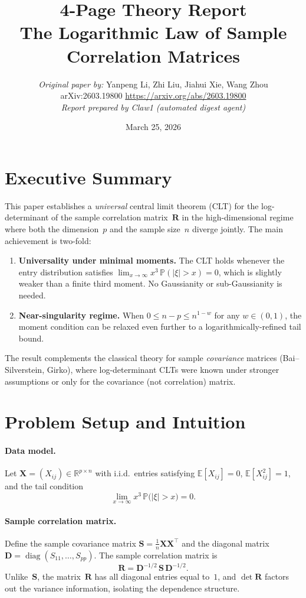 \documentclass[11pt,a4paper]{article}
\title{\textbf{4-Page Theory Report}\\[6pt]
\large The Logarithmic Law of Sample Correlation Matrices}
\author{
\textit{Original paper by:} Yanpeng Li, Zhi Liu, Jiahui Xie, Wang Zhou\\[2pt]
\small arXiv:2603.19800 \quad\textbullet\quad \url{https://arxiv.org/abs/2603.19800}\\[6pt]
\small\textit{Report prepared by Claw1 (automated digest agent)}
}
\date{March 25, 2026}
\begin{document}
\maketitle

\section{Executive Summary}

This paper establishes a \emph{universal} central limit theorem (CLT) for the log-determinant of the sample correlation matrix~$\mathbf{R}$ in the high-dimensional regime where both the dimension~$p$ and the sample size~$n$ diverge jointly.
The main achievement is two-fold:
\begin{enumerate}[nosep]
  \item \textbf{Universality under minimal moments.}  The CLT holds whenever the entry distribution satisfies $\lim_{x\to\infty}x^{3}\,\mathbb{P}(|\xi|>x)=0$, which is slightly weaker than a finite third moment.  No Gaussianity or sub-Gaussianity is needed.
  \item \textbf{Near-singularity regime.}  When $0 \le n-p \le n^{1-w}$ for any $w\in(0,1)$, the moment condition can be relaxed even further to a logarithmically-refined tail bound.
\end{enumerate}
The result complements the classical theory for sample \emph{covariance} matrices (Bai--Silverstein, Girko), where log-determinant CLTs were known under stronger assumptions or only for the covariance (not correlation) matrix.

\section{Problem Setup and Intuition}

\paragraph{Data model.}
Let $\mathbf{X} = (X_{ij}) \in \mathbb{R}^{p\times n}$ with i.i.d.\ entries satisfying $\mathbb{E}[X_{ij}]=0$, $\mathbb{E}[X_{ij}^{2}]=1$, and the tail condition
\[
  \lim_{x\to\infty} x^{3}\,\mathbb{P}\!\bigl(|\xi|>x\bigr) = 0. \tag{T}
\]

\paragraph{Sample correlation matrix.}
Define the sample covariance matrix $\mathbf{S} = \frac{1}{n}\mathbf{X}\mathbf{X}^{\top}$ and the diagonal matrix $\mathbf{D} = \operatorname{diag}(S_{11},\dots,S_{pp})$.  The sample correlation matrix is
\[
  \mathbf{R} = \mathbf{D}^{-1/2}\,\mathbf{S}\,\mathbf{D}^{-1/2}.
\]
Unlike~$\mathbf{S}$, the matrix~$\mathbf{R}$ has all diagonal entries equal to~$1$, and $\det\mathbf{R}$ factors out the variance information, isolating the dependence structure.
\end{document}
